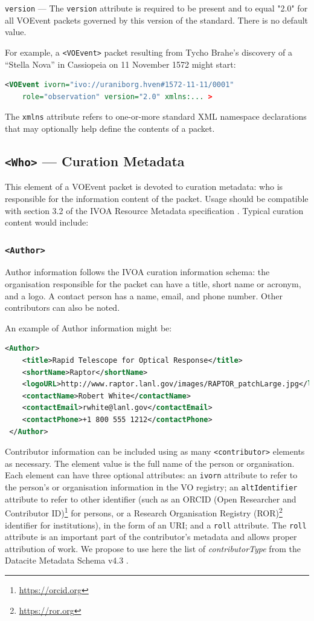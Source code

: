 \documentclass[11pt,a4paper]{ivoa}
\begin{document}
 {\tt version} \label{sec:3.1.3} --- 
The {\tt version} attribute is required to be present and to equal "2.0" for all VOEvent packets governed by this version of the standard. There is no default value. 

For example, a {\tt <VOEvent>} packet resulting from Tycho Brahe's discovery of a ``Stella Nova'' in Cassiopeia on 11 November 1572 might start: 
\begin{lstlisting}[language=XML]
<VOEvent ivorn="ivo://uraniborg.hven#1572-11-11/0001" 
    role="observation" version="2.0" xmlns:... >
\end{lstlisting}

The {\tt xmlns} attribute refers to one-or-more standard XML namespace declarations that may optionally help define the contents of a packet. 

\subsection{{\tt <Who>} --- Curation Metadata}
\label{sec:3.2}
This element of a VOEvent packet is devoted to curation metadata: who is responsible for the information content of the packet. Usage should be compatible with section 3.2 of the IVOA Resource Metadata specification \citep{2007ivoa.spec.0302H}. Typical curation content would include: 

\subsubsection{\tt <Author>}
Author information follows the IVOA curation information schema: the organisation responsible for the packet can have a title, short name or acronym, and a logo. A contact person has a name, email, and phone number. Other contributors can also be noted. 

An example of Author information might be: 
\begin{lstlisting}[language=XML]
<Author>
    <title>Rapid Telescope for Optical Response</title>
    <shortName>Raptor</shortName>     
    <logoURL>http://www.raptor.lanl.gov/images/RAPTOR_patchLarge.jpg</logoURL>     
    <contactName>Robert White</contactName>     
    <contactEmail>rwhite@lanl.gov</contactEmail>
    <contactPhone>+1 800 555 1212</contactPhone>
 </Author> 
\end{lstlisting}

Contributor information can be included using as many {\tt <contributor>} elements as necessary. The element value is the full name of the person or organisation. Each element can have three optional attributes: an {\tt ivorn} attribute to refer to the person's or organisation information in the VO registry; an {\tt altIdentifier} attribute to refer to other identifier (such as an ORCID (Open Researcher and Contributor ID)\footnote{\url{https://orcid.org}} for persons, or a Research Organisation Registry (ROR)\footnote{\url{https://ror.org}} identifier for institutions), in the form of an URI; and a {\tt roll} attribute. The {\tt roll} attribute is an important part of the contributor's metadata and allows proper attribution of work. We propose to use here the list of \emph{contributorType} from the Datacite Metadata Schema v4.3 \citep{https://doi.org/10.14454/7xq3-zf69}.
\end{document}
